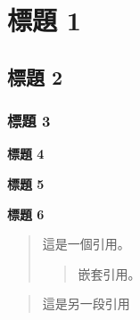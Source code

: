 \documentclass[12pt]{article}
\begin{document}
\section{標題 1}

\subsection{標題 2}

\subsubsection{標題 3}

\textbf{標題 4}

\textbf{標題 5}

\textbf{標題 6}

\begin{quote}
	這是一個引用。
	\begin{quote}
	嵌套引用。
	\end{quote}


\end{quote}

\begin{quote}
	這是另一段引用
\end{quote}
\end{document}
